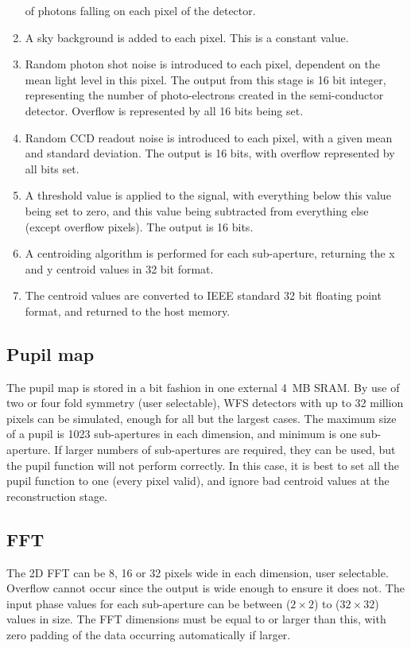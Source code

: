 \documentclass{article}
\begin{document}
\begin{enumerate}
  of photons falling on each pixel of the detector.
\item A sky background is added to each pixel.  This is a constant
  value.
\item Random photon shot noise is introduced to each pixel, dependent
  on the mean light level in this pixel.  The output from this stage
  is 16 bit integer, representing the number of photo-electrons
  created in the semi-conductor detector.  Overflow is represented by
  all 16 bits being set.
\item Random CCD readout noise is introduced to each pixel, with a
  given mean and standard deviation.  The output is 16 bits, with
  overflow represented by all bits set.
\item A threshold value is applied to the signal, with everything
  below this value being set to zero, and this value being subtracted
  from everything else (except overflow pixels).  The output is 16
  bits.
\item A centroiding algorithm is performed for each sub-aperture,
  returning the x and y centroid values in 32 bit format.
\item The centroid values are converted to IEEE standard 32 bit
  floating point format, and returned to the host memory.


\end{enumerate}

\subsection{Pupil map}
The pupil map is stored in a bit fashion in one external 4~MB SRAM.
By use of two or four fold symmetry (user selectable), WFS detectors
with up to 32 million pixels can be simulated, enough for all but the
largest cases.  The maximum size of a pupil is 1023 sub-apertures in
each dimension, and minimum is one sub-aperture.  If larger numbers of
sub-apertures are required, they can be used, but the pupil function
will not perform correctly.  In this case, it is best to set all the
pupil function to one (every pixel valid), and ignore bad centroid
values at the reconstruction stage.

\subsection{FFT}
The 2D FFT can be 8, 16 or 32 pixels wide in each dimension, user
selectable.  Overflow cannot occur since the output is wide enough to
ensure it does not.  The input phase values for each sub-aperture can
be between ($2\times2$) to ($32\times32$) values in size.  The FFT
dimensions must be equal to or larger than this, with zero padding of
the data occurring automatically if larger.
\end{document}
